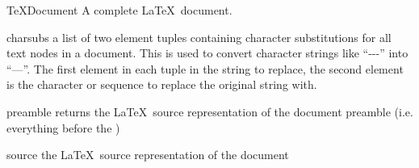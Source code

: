 \begin{classdesc}{TeXDocument}{}
A complete \LaTeX\ document.
\end{classdesc}

\begin{memberdesc}[TeXDocument]{charsubs}
a list of two element tuples containing character substitutions for all
text nodes in a document.  This is used to convert character strings
like ``-{}-{}-'' into ``---''.  The first element in each tuple in the
string to replace, the second element is the character or sequence to 
replace the original string with.
\end{memberdesc}

\begin{memberdesc}[TeXDocument]{preamble}
returns the \LaTeX\ source representation of the document preamble 
(i.e. everything before the )
\end{memberdesc}

\begin{memberdesc}[TeXDocument]{source}
the \LaTeX\ source representation of the document 
\end{memberdesc}
